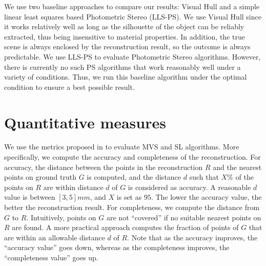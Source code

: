 We use two baseline approaches to compare our results: Visual Hull and a simple linear least squares based Photometric Stereo (LLS-PS). We use Visual Hull since it works relatively well as long as the silhouette of the object can be reliably extracted, thus being insensitive to material properties. In addition, the true scene is always enclosed by the reconstruction result, so the outcome is always predictable. We use LLS-PS to evaluate Photometric Stereo algorithms. However, there is currently no such PS algorithms that work reasonably well under a variety of conditions. Thus, we run this baseline algorithm under the optimal condition to ensure a best possible result.

\section{Quantitative measures}
We use the metrics proposed in \cite{seitz2006comparison} to evaluate MVS and SL algorithms. More specifically, we compute the accuracy and completeness of the reconstruction. For accuracy, the distance between the points in the reconstruction $R$ and the nearest points on ground truth $G$ is computed, and the distance $d$ such that $X\%$ of the points on $R$ are within distance $d$ of $G$ is considered as accuracy. A reasonable $d$ value is between $[3, 5]mm$, and $X$ is set as $95$. The lower the accuracy value, the better the reconstruction result. For completeness, we compute the distance from $G$ to $R$. Intuitively, points on $G$ are not ``covered'' if no suitable nearest points on $R$ are found. A more practical approach computes the fraction of points of $G$ that are within an allowable distance $d$ of $R$. Note that as the accuracy improves, the ``accuracy value'' goes down, whereas as the completeness improves, the ``completeness value'' goes up.

